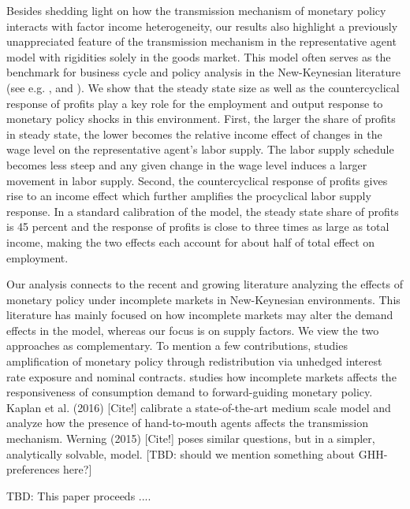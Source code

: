 Besides shedding light on how the transmission mechanism of monetary policy interacts with factor income heterogeneity, our results also highlight a previously unappreciated feature of the transmission mechanism in the representative agent model with rigidities solely in the goods market. This model often serves as the benchmark for business cycle and policy analysis in the New-Keynesian literature (see e.g. \citet{Lorenzoni2009}, \citet{Christiano2011} and \citet{Werning2012}). We show that the steady state size as well as the countercyclical response of profits play a key role for the employment and output response to monetary policy shocks in this environment. First, the larger the share of profits in steady state, the lower becomes the relative income effect of changes in the wage level on the representative agent's labor supply. The labor supply schedule becomes less steep and any given change in the wage level induces a larger movement in labor supply. Second, the countercyclical response of profits gives rise to an income effect which further amplifies the procyclical labor supply response. In a standard calibration of the model, the steady state share of profits is 45 percent and the response of profits is close to three times as large as total income, making the two effects each account for about half of total effect on employment.

Our analysis connects to the recent and growing literature analyzing the effects of monetary policy under incomplete markets in New-Keynesian environments. This literature has mainly focused on how incomplete markets may alter the demand effects in the model, whereas our focus is on supply factors. We view the two approaches as complementary. To mention a few contributions, \citet{Auclert2015} studies amplification of monetary policy through redistribution via unhedged interest rate exposure and nominal contracts. \citet{McKay2015} studies how incomplete markets affects the responsiveness of consumption demand to forward-guiding monetary policy. Kaplan et al. (2016) [Cite!] calibrate a state-of-the-art medium scale model and analyze how the presence of hand-to-mouth agents affects the transmission mechanism. Werning (2015) [Cite!] poses similar questions, but in a simpler, analytically solvable, model. [TBD: should we mention something about GHH-preferences here?]

TBD: This paper proceeds ....